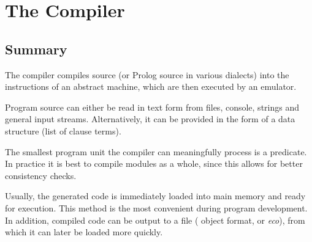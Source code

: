 %
% 
% 
% 
% 
%
%
%
%
\chapter{The Compiler}
\label{chapcompiler}

\section{Summary}
The {\eclipse} compiler compiles {\eclipse} source (or Prolog source in
various dialects) into the instructions of an abstract machine, which
are then executed by an emulator.

Program source can either be read in text form from files, console,
strings and general input streams.  Alternatively, it can be provided
in the form of a data structure (list of clause terms).

The smallest program unit the compiler can meaningfully process is a
predicate. In practice it is best to compile modules as a whole, since
this allows for better consistency checks.

Usually, the generated code is immediately loaded into main memory and
ready for execution.
This method is the most convenient during program development.
In addition, compiled code can be output to a file ({\eclipse}
object format, or {\it eco}), from which it can later be loaded more quickly.


